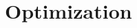 \documentclass[../book/calcnotes.tex]{subfiles}
\begin{document}
\section{Optimization}
\label{sec:optimization}

\begin{exercises}
\end{exercises}
\end{document}

